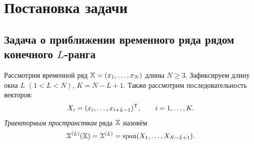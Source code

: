 \documentclass[12pt,a4paper,fleqn,leqno]{article}
\begin{document}



\section{Постановка задачи}
\subsection{Задача о приближении временного ряда рядом конечного $L$-ранга}\label{series_appr}
Рассмотрим временной ряд $\mathbb{X} = (x_1, \ldots, x_N)$ длины $N \ge 3$. Зафиксируем длину окна $L$ $(1 < L < N)$, $K = N - L + 1$. Также рассмотрим последовательность векторов:
\begin{equation}\label{l_lagged}
X_i = (x_i, \ldots, x_{i + L - 1})^{\mathrm{T}}, \qquad i = 1, \ldots, K.
\end{equation}
\emph{Траекторным пространством} ряда $\mathbb{X}$ назовём $$\EuScript{X}^{(L)}(\mathbb{X}) = \EuScript{X}^{(L)} = \text{span}(X_1, \ldots, X_{N-L+1}).$$
\end{document}
